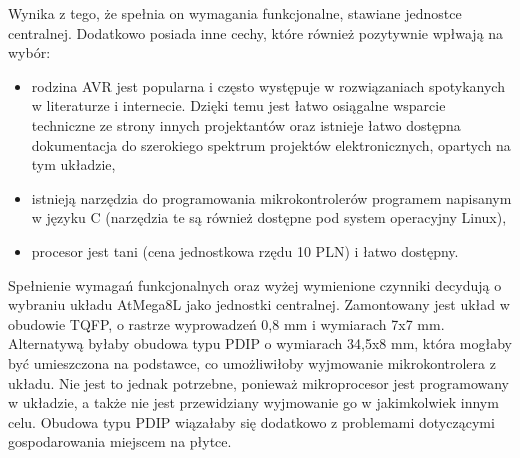 Wynika z tego, że spełnia on wymagania funkcjonalne, stawiane jednostce centralnej. Dodatkowo posiada inne cechy, które również pozytywnie wpłwają na wybór:
\begin{itemize}
	\item rodzina AVR jest popularna i często występuje w rozwiązaniach spotykanych w literaturze i internecie. Dzięki temu jest łatwo osiągalne wsparcie techniczne ze strony innych projektantów oraz istnieje łatwo dostępna dokumentacja do szerokiego spektrum projektów elektronicznych, opartych na tym układzie,
	\item istnieją narzędzia do programowania mikrokontrolerów programem napisanym w języku C (narzędzia te są również dostępne pod system operacyjny Linux),
	\item procesor jest tani (cena jednostkowa rzędu 10 PLN) i łatwo dostępny.
\end{itemize}
Spełnienie wymagań funkcjonalnych oraz wyżej wymienione czynniki decydują o wybraniu układu AtMega8L jako jednostki centralnej.
Zamontowany jest układ w obudowie TQFP, o rastrze wyprowadzeń 0,8 mm i wymiarach 7x7 mm. Alternatywą byłaby obudowa typu PDIP o wymiarach 34,5x8 mm, która mogłaby być umieszczona na podstawce, co umożliwiłoby wyjmowanie mikrokontrolera z układu. Nie jest to jednak potrzebne, ponieważ mikroprocesor jest programowany w układzie, a także nie jest przewidziany wyjmowanie go w jakimkolwiek innym celu. Obudowa typu PDIP wiązałaby się dodatkowo z problemami dotyczącymi gospodarowania miejscem na płytce.

